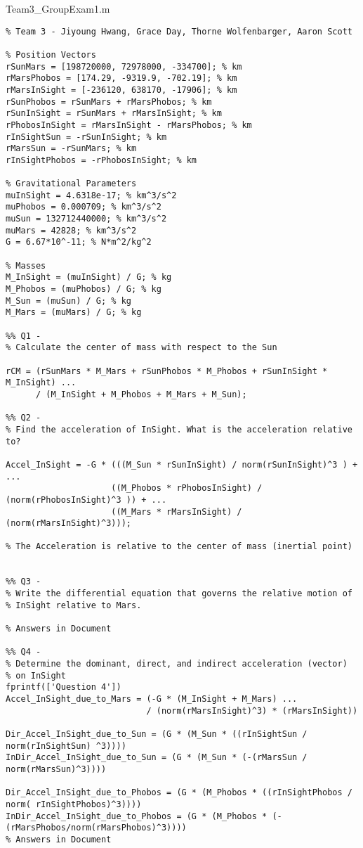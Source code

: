 Team3\_GroupExam1.m
\begin{lstlisting}[frame=lines,style=Matlab-editor,basicstyle = \mlttfamily]
%% AE 313 Group Exam 1
% Team 3 - Jiyoung Hwang, Grace Day, Thorne Wolfenbarger, Aaron Scott

% Position Vectors
rSunMars = [198720000, 72978000, -334700]; % km
rMarsPhobos = [174.29, -9319.9, -702.19]; % km
rMarsInSight = [-236120, 638170, -17906]; % km
rSunPhobos = rSunMars + rMarsPhobos; % km
rSunInSight = rSunMars + rMarsInSight; % km
rPhobosInSight = rMarsInSight - rMarsPhobos; % km
rInSightSun = -rSunInSight; % km
rMarsSun = -rSunMars; % km
rInSightPhobos = -rPhobosInSight; % km

% Gravitational Parameters
muInSight = 4.6318e-17; % km^3/s^2
muPhobos = 0.000709; % km^3/s^2
muSun = 132712440000; % km^3/s^2
muMars = 42828; % km^3/s^2
G = 6.67*10^-11; % N*m^2/kg^2

% Masses
M_InSight = (muInSight) / G; % kg
M_Phobos = (muPhobos) / G; % kg
M_Sun = (muSun) / G; % kg
M_Mars = (muMars) / G; % kg

%% Q1 -
% Calculate the center of mass with respect to the Sun

rCM = (rSunMars * M_Mars + rSunPhobos * M_Phobos + rSunInSight * M_InSight) ...
      / (M_InSight + M_Phobos + M_Mars + M_Sun);

%% Q2 -
% Find the acceleration of InSight. What is the acceleration relative to?

Accel_InSight = -G * (((M_Sun * rSunInSight) / norm(rSunInSight)^3 ) + ...
                     ((M_Phobos * rPhobosInSight) / (norm(rPhobosInSight)^3 )) + ...
                     ((M_Mars * rMarsInSight) / (norm(rMarsInSight)^3)));

% The Acceleration is relative to the center of mass (inertial point)


%% Q3 -
% Write the differential equation that governs the relative motion of
% InSight relative to Mars.

% Answers in Document

%% Q4 -
% Determine the dominant, direct, and indirect acceleration (vector)
% on InSight
fprintf(['Question 4'])
Accel_InSight_due_to_Mars = (-G * (M_InSight + M_Mars) ...
                            / (norm(rMarsInSight)^3) * (rMarsInSight))

Dir_Accel_InSight_due_to_Sun = (G * (M_Sun * ((rInSightSun / norm(rInSightSun) ^3))))
InDir_Accel_InSight_due_to_Sun = (G * (M_Sun * (-(rMarsSun / norm(rMarsSun)^3))))

Dir_Accel_InSight_due_to_Phobos = (G * (M_Phobos * ((rInSightPhobos / norm( rInSightPhobos)^3))))
InDir_Accel_InSight_due_to_Phobos = (G * (M_Phobos * (-(rMarsPhobos/norm(rMarsPhobos)^3))))
% Answers in Document


\end{lstlisting}
